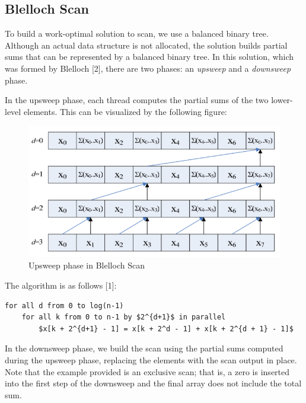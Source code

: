 \documentclass[twoside]{article}
\begin{document}
\subsection{Blelloch Scan}

To build a work-optimal solution to scan, we use a balanced binary tree. Although an actual data structure is not allocated, the solution builds partial sums that can be represented by a balanced binary tree. In this solution, which was formed by Blelloch [2], there are two phases: an {\em upsweep} and a {\em downsweep} phase.

In the upsweep phase, each thread computes the partial sums of the two lower-level elements. This can be visualized by the following figure:

\begin{figure}[h]
    \centering
    \includegraphics{upsweep}
    \caption{Upsweep phase in Blelloch Scan}
    \label{fig:upsweep}
\end{figure}
\break

The algorithm is as follows [1]:

\begin{lstlisting}[caption=Upsweep Phase, mathescape]
for all d from 0 to log(n-1)
    for all k from 0 to n-1 by $2^{d+1}$ in parallel
        $x[k + 2^{d+1} - 1] = x[k + 2^d - 1] + x[k + 2^{d + 1} - 1]$
\end{lstlisting}

In the downsweep phase, we build the scan using the partial sums computed during the upsweep phase, replacing the elements with the scan output in place. Note that the example provided is an exclusive scan; that is, a zero is inserted into the first step of the downsweep and the final array does not include the total sum.
\end{document}
